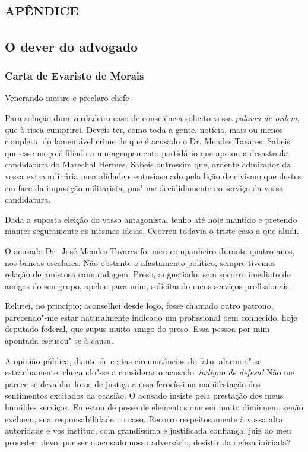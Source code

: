 \part{\textsc{apêndice}}

\chapter{O dever do advogado}

\section{Carta de Evaristo de Morais}
\bigskip

\noindent Venerando mestre e preclaro chefe
\bigskip

\begingroup
\linenumbers

Para solução dum verdadeiro caso de
consciência solicito vossa \textit{palavra de ordem}, que à risca
cumprirei. Deveis ter, como toda a gente, notícia, mais ou menos
completa, do lamentável crime de que é acusado o Dr. Mendes Tavares.
Sabeis que esse moço é filiado a um agrupamento partidário que apoiou a
desastrada candidatura do Marechal Hermes. Sabeis outrossim que,
ardente admirador da vossa extraordinária mentalidade e entusiasmado
pela lição de civismo que destes em face da imposição militarista,
pus"-me decididamente ao serviço da vossa candidatura. 

Dada a suposta eleição do vosso antagonista, tenho até hoje mantido e pretendo manter
seguramente as mesmas ideias. Ocorreu todavia o triste caso a que aludi. 

O acusado Dr.~José Mendes Tavares foi meu companheiro durante
quatro anos, nos bancos escolares. Não obstante o afastamento
político, sempre tivemos relação de amistosa camaradagem. Preso,
angustiado, sem socorro imediato de amigos do seu grupo, apelou para
mim, solicitando meus serviços profissionais. 

Relutei, no princípio;
aconselhei desde logo, fosse chamado outro patrono, parecendo"-me
estar naturalmente indicado um profissional bem conhecido, hoje
deputado federal, que supus muito amigo do preso. Essa pessoa por mim
apontada escusou"-se à causa. 

A opinião pública, diante de certas
circunstâncias do fato, alarmou"-se estranhamente, chegando"-se a
considerar o acusado \textit{indigno de defesa!} Não me
parece se deva dar foros de justiça a essa ferocíssima manifestação dos
sentimentos excitados da ocasião. O acusado insiste pela prestação dos
meus humildes serviços. Eu estou de posse de elementos que em muito
diminuem, senão excluem, sua responsabilidade no caso. Recorro
respeitosamente à vossa alta autoridade e vos instituo, com
grandíssima e justificada confiança, juiz do meu proceder: devo, por
ser o acusado nosso adversário, desistir da defesa iniciada?


